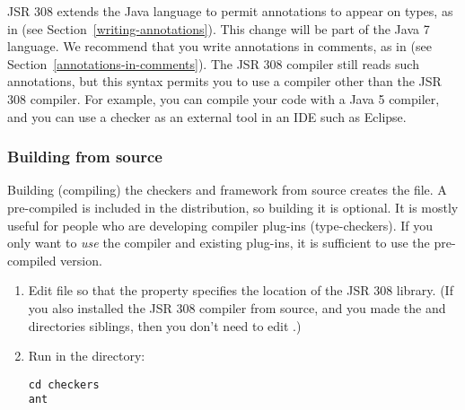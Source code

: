 JSR 308 extends the Java language to permit annotations to appear on types,
as in  (see Section~\ref{writing-annotations}).
This change will be part of the Java 7 language.  We recommend that you
write annotations in comments, as in  (see
Section~\ref{annotations-in-comments}).  The JSR 308 compiler still reads
such annotations, but this syntax permits you to use a compiler other than
the JSR 308 compiler.  For example, you can compile your code with a Java 5
compiler, and you can use a checker as an external tool in an IDE such as
Eclipse.




\subsubsection{Building from source\label{building}}

Building (compiling) the checkers and framework from source creates the
 file.  A pre-compiled  is included
in the distribution, so building it is optional.  It is mostly useful for
people who are developing compiler plug-ins (type-checkers).  If you only
want to \emph{use} the compiler and existing plug-ins, it is sufficient to
use the pre-compiled version.

\begin{enumerate}
\item
Edit  file so that the
 property specifies the location of the JSR 308
 library.  (If you also installed the JSR 308 compiler from
source, and you made the  and  directories
siblings, then you don't need to edit .)

\item
Run  in the  directory:

\begin{Verbatim}
cd checkers
ant
\end{Verbatim}

\end{enumerate}


